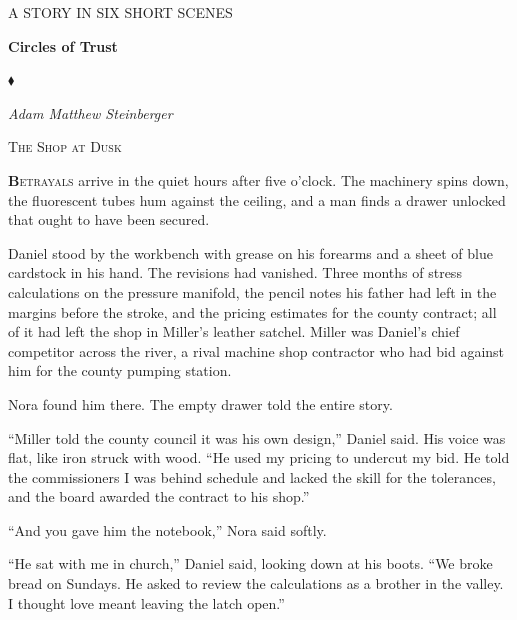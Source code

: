 \documentclass[11pt]{article}
\begin{document}
\begin{titlepage}
    \centering
    \vspace*{1.5in}
    {\scshape\footnotesize A STORY IN SIX SHORT SCENES\par}
    \vspace{0.8in}
    {\Huge\textbf{Circles of Trust}\par}
    \vspace{0.3in}
    {\normalsize $\blacklozenge$\par}
    \vspace{0.4in}
    {\itshape\large Adam Matthew Steinberger\par}
    \vfill
\end{titlepage}

\newpage
\setcounter{page}{2}

\begin{center}
    {\scshape\large The Shop at Dusk}\par
    \vspace{0.2in}
\end{center}

\lettrine[lines=3,findent=3pt,nindent=0pt]{\textbf{B}}{etrayals} arrive in the quiet hours after five o’clock. The machinery spins down, the fluorescent tubes hum against the ceiling, and a man finds a drawer unlocked that ought to have been secured.

Daniel stood by the workbench with grease on his forearms and a sheet of blue cardstock in his hand. The revisions had vanished. Three months of stress calculations on the pressure manifold, the pencil notes his father had left in the margins before the stroke, and the pricing estimates for the county contract; all of it had left the shop in Miller’s leather satchel. Miller was Daniel’s chief competitor across the river, a rival machine shop contractor who had bid against him for the county pumping station.

Nora found him there. The empty drawer told the entire story.

``Miller told the county council it was his own design,'' Daniel said. His voice was flat, like iron struck with wood. ``He used my pricing to undercut my bid. He told the commissioners I was behind schedule and lacked the skill for the tolerances, and the board awarded the contract to his shop.''

``And you gave him the notebook,'' Nora said softly.

``He sat with me in church,'' Daniel said, looking down at his boots. ``We broke bread on Sundays. He asked to review the calculations as a brother in the valley. I thought love meant leaving the latch open.''
\end{document}
